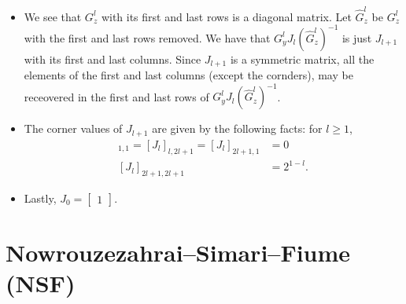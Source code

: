 \documentclass[10pt]{article}
\begin{document}
\begin{itemize}
        \item We see that $G^l_z$ with its first and last rows is a diagonal matrix.  Let $\hat{G}^l_z$ be $G^l_z$ with the first and last rows removed.  We have that $G^l_y J_l (\hat{G}^l_z)^{-1}$ is just $J_{l+1}$ with its first and last columns.
        Since $J_{l+1}$ is a symmetric matrix, all the elements of the first and last columns (except the cornders), may be receovered in the first and last rows of $G^l_y J_l (\hat{G}^l_z)^{-1}$.

        \item The corner values of $J_{l+1}$ are given by the following facts: for $l \geq 1$,
        \begin{align*}
            [J_l]_{1,1} = [J_l]_{l,2l+1} = [J_l]_{2l+1,1} &= 0 \\
            [J_l]_{2l+1,2l+1} &= 2^{1-l}.
        \end{align*}

        \item Lastly, $J_0 = \begin{bmatrix}
            1
        \end{bmatrix}$.
    \end{itemize}

    \section{Nowrouzezahrai--Simari--Fiume (NSF)}
\end{document}
